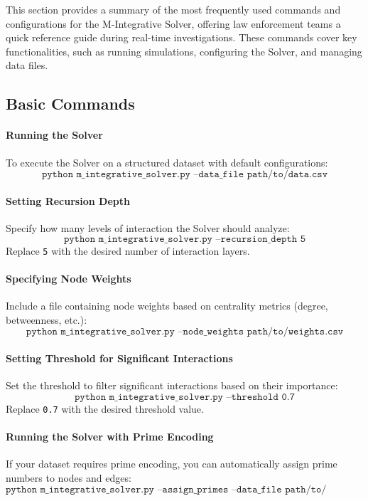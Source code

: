 \documentclass[%
 preprint, linenumbers,
 amsmath,amssymb,
 aps, physrev,
]{revtex4-2}
\begin{document}
This section provides a summary of the most frequently used commands and configurations for the M-Integrative Solver, offering law enforcement teams a quick reference guide during real-time investigations. These commands cover key functionalities, such as running simulations, configuring the Solver, and managing data files.

\subsection*{Basic Commands}

\paragraph{Running the Solver}
To execute the Solver on a structured dataset with default configurations:
\[
\texttt{python m\_integrative\_solver.py --data\_file path/to/data.csv}
\]

\paragraph{Setting Recursion Depth}
Specify how many levels of interaction the Solver should analyze:
\[
\texttt{python m\_integrative\_solver.py --recursion\_depth 5}
\]
Replace \texttt{5} with the desired number of interaction layers.

\paragraph{Specifying Node Weights}
Include a file containing node weights based on centrality metrics (degree, betweenness, etc.):
\[
\texttt{python m\_integrative\_solver.py --node\_weights path/to/weights.csv}
\]

\paragraph{Setting Threshold for Significant Interactions}
Set the threshold to filter significant interactions based on their importance:
\[
\texttt{python m\_integrative\_solver.py --threshold 0.7}
\]
Replace \texttt{0.7} with the desired threshold value.

\paragraph{Running the Solver with Prime Encoding}
If your dataset requires prime encoding, you can automatically assign prime numbers to nodes and edges:
\[
\texttt{python m\_integrative\_solver.py --assign\_primes --data\_file path/to/data.csv}
\]
\end{document}
